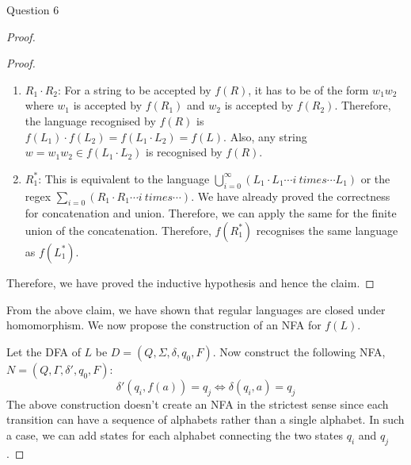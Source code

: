 \begin{solution}{Question 6}
\begin{proof}
\begin{proof}
\begin{enumerate}
				\item $R_1 \cdot R_2$: For a string to be accepted by $f(R)$, it has to be of the form $w_1w_2$ where $w_1$ is accepted by $f(R_1)$ and $w_2$ is accepted by $f(R_2)$. Therefore, the language recognised by $f(R)$ is $f(L_1)\cdot f(L_2) = f(L_1\cdot L_2) = f(L)$. Also, any string $w = w_1w_2 \in f(L_1\cdot L_2)$ is recognised by $f(R)$.
				\item $R_1^*$: This is equivalent to the language $\bigcup_{i=0}^\infty (L_1\cdot L_1 \cdots i\ times\cdots L_1)$ or the regex $\sum_{i=0}(R_1\cdot R_1\cdots i\ times\cdots)$. We have already proved the correctness for concatenation and union. Therefore, we can apply the same for the finite union of the concatenation. Therefore, $f(R_1^*)$ recognises the same language as $f(L_1^*)$.
			\end{enumerate}
			Therefore, we have proved the inductive hypothesis and hence the claim.
		\end{proof}
		From the above claim, we have shown that regular languages are closed under homomorphism. We now propose the construction of an NFA for $f(L)$.\par
		Let the DFA of $L$ be $D = (Q, \Sigma, \delta, q_0, F)$. Now construct the following NFA, $N = (Q, \Gamma, \delta', q_0, F)$:
		\begin{equation}
			\delta'(q_i, f(a)) = q_j \iff \delta(q_i, a) = q_j
		\end{equation}
		The above construction doesn't create an NFA in the strictest sense since each transition can have a sequence of alphabets rather than a single alphabet. In such a case, we can add states for each alphabet connecting the two states $q_i$ and $q_j$.
	\end{proof}
\end{solution}
